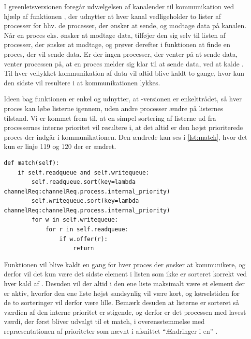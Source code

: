 I greenletsversionen foregår udvælgelsen af kanalender til kommunikation ved hjælp af funktionen , der udnytter at  hver kanal vedligeholder to lister af processer for hhv. de processer, der ønsker at sende, og modtage data på kanalen. Når en proces eks. ønsker at modtage data, tilføjer den sig selv til listen af processer, der ønsker at modtage, og prøver derefter i  funktionen at finde en proces, der vil sende data. Er der ingen processer, der venter på at sende data, venter processen på, at en proces melder sig klar til at sende data, ved at kalde . Til hver vellykket kommunikation af data vil  altid blive kaldt to gange, hvor kun den sidste vil resultere i at kommunikationen lykkes.

Ideen bag funktionen  er enkel og  udnytter, at -versionen er enkelttrådet, så hver proces kan løbe listerne igennem, uden andre processer ændre på listernes tilstand.  Vi er kommet frem til, at  en simpel sortering af listerne ud fra processernes interne prioritet vil resultere i, at det altid er den højst prioriterede proces der indgår i kommunikationen. Den ændrede  kan ses i \cref{lst:match}, hvor det kun er linje 119 og 120 der er ændret.

\begin{lstlisting}[firstnumber=117 ,float=hbtp, label=lst:match, caption=Funktionen \code{match} der sorterer kanalrequests.]
def match(self):        
    if self.readqueue and self.writequeue:
        self.readqueue.sort(key=lambda channelReq:channelReq.process.internal_priority)
        self.writequeue.sort(key=lambda channelReq:channelReq.process.internal_priority)
        for w in self.writequeue:
            for r in self.readqueue:
                if w.offer(r):
                    return       
\end{lstlisting}

Funktionen  vil blive kaldt en gang for hver proces der ønsker at kommunikere, og derfor vil det kun være det sidste element i listen som ikke er sorteret korrekt ved hver kald af . Desuden vil der altid i den ene liste maksimalt være et element der er aktiv, hvorfor den ene liste højst sandsynlig vil være kort, og kørselstiden for de to sorteringer vil derfor være lille. Bemærk desuden at listerne er sorteret så værdien af den interne prioritet er stigende, og derfor er det processen med lavest værdi, der først bliver udvalgt til et match, i overensstemmelse med repræsentationen af prioriteter som nævnt i afsnittet ``Ændringer i \sched en'' .


